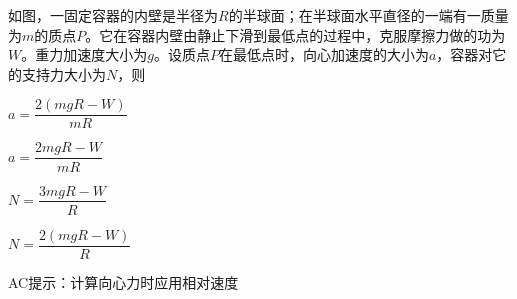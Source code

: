 如图，一固定容器的内壁是半径为\(R\)的半球面；在半球面水平直径的一端有一质量为\(m\)的质点\(P\)。它在容器内壁由静止下滑到最低点的过程中，克服摩擦力做的功为\(W\)。重力加速度大小为\(g\)。设质点\(P\)在最低点时，向心加速度的大小为\(a\)，容器对它的支持力大小为\(N\)，则\paren[]

\begin{choices}
	\item\(a = \dfrac{2(mgR - W)}{mR}\)
	\item\(a = \dfrac{2mgR - W}{mR}\)
	\item\(N = \dfrac{3mgR - W}{R}\)
	\item\(N = \dfrac{2(mgR - W)}{R}\)
\end{choices}
\begin{answer}
    AC\qquad 提示：计算向心力时应用相对速度
\end{answer}